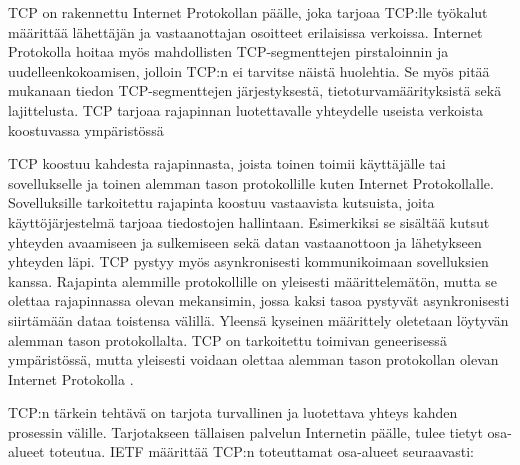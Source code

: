 \documentclass[utf8]{gradu3}
\begin{document}
TCP on rakennettu Internet Protokollan päälle, joka tarjoaa TCP:lle työkalut määrittää lähettäjän ja vastaanottajan osoitteet erilaisissa verkoissa. Internet Protokolla hoitaa myös mahdollisten TCP-segmenttejen pirstaloinnin ja uudelleenkokoamisen, jolloin TCP:n ei tarvitse näistä huolehtia. Se myös pitää mukanaan tiedon TCP-segmenttejen järjestyksestä, tietoturvamäärityksistä sekä lajittelusta. TCP tarjoaa rajapinnan luotettavalle yhteydelle useista verkoista koostuvassa ympäristössä \parencite{tcp1_1} 

TCP koostuu kahdesta rajapinnasta, joista toinen toimii käyttäjälle tai sovellukselle ja toinen alemman tason protokollille kuten Internet Protokollalle. Sovelluksille tarkoitettu rajapinta koostuu vastaavista kutsuista, joita käyttöjärjestelmä tarjoaa tiedostojen hallintaan. Esimerkiksi se sisältää kutsut yhteyden avaamiseen ja sulkemiseen sekä datan vastaanottoon ja lähetykseen yhteyden läpi. TCP pystyy myös asynkronisesti kommunikoimaan sovelluksien kanssa. Rajapinta alemmille protokollille on yleisesti määrittelemätön, mutta se olettaa rajapinnassa olevan mekansimin, jossa kaksi tasoa pystyvät asynkronisesti siirtämään dataa toistensa välillä. Yleensä kyseinen määrittely oletetaan löytyvän alemman tason protokollalta. TCP on tarkoitettu toimivan geneerisessä ympäristössä, mutta yleisesti voidaan olettaa alemman tason protokollan olevan Internet Protokolla \parencite{tcp1_4}.

TCP:n tärkein tehtävä on tarjota turvallinen ja luotettava yhteys kahden prosessin välille. Tarjotakseen tällaisen palvelun Internetin päälle, tulee tietyt osa-alueet toteutua. IETF \parencite{tcp1_4}  määrittää TCP:n toteuttamat osa-alueet seuraavasti:
\end{document}
